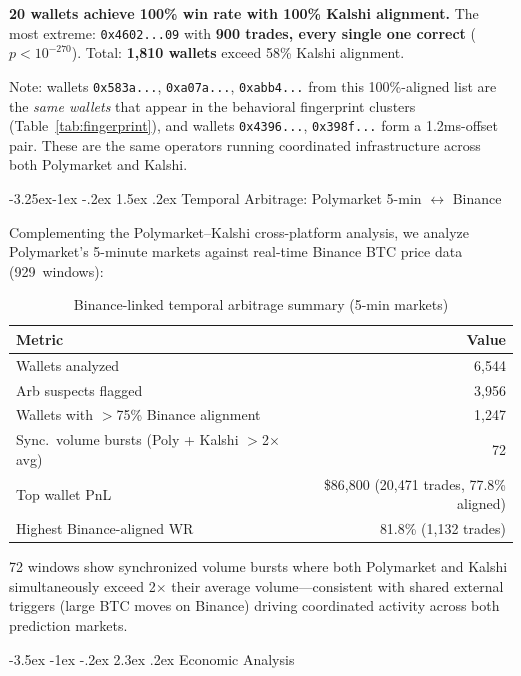 \documentclass[11pt,a4paper]{article}
\makeatletter
\renewcommand\section{\@startsection{section}{1}{\z@}%
  {-3.5ex \@plus -1ex \@minus -.2ex}%
  {2.3ex \@plus .2ex}%
  {\normalfont\Large\bfseries}}
\renewcommand\subsection{\@startsection{subsection}{2}{\z@}%
  {-3.25ex\@plus -1ex \@minus -.2ex}%
  {1.5ex \@plus .2ex}%
  {\normalfont\large\bfseries}}
\makeatother
\begin{document}
\textbf{20 wallets achieve 100\% win rate with 100\% Kalshi alignment.} The most extreme: \texttt{0x4602...09} with \textbf{900 trades, every single one correct} ($p < 10^{-270}$). Total: \textbf{1,810 wallets} exceed 58\% Kalshi alignment.

Note: wallets \texttt{0x583a...}, \texttt{0xa07a...}, \texttt{0xabb4...} from this 100\%-aligned list are the \emph{same wallets} that appear in the behavioral fingerprint clusters (Table~\ref{tab:fingerprint}), and wallets \texttt{0x4396...}, \texttt{0x398f...} form a 1.2ms-offset pair. These are the same operators running coordinated infrastructure across both Polymarket and Kalshi.

\subsection{Temporal Arbitrage: Polymarket 5-min $\leftrightarrow$ Binance}

Complementing the Polymarket--Kalshi cross-platform analysis, we analyze Polymarket's 5-minute markets against real-time Binance BTC price data (929~windows):

\begin{table}[H]
\centering
\caption{Binance-linked temporal arbitrage summary (5-min markets)}
\label{tab:binance_temporal}
\small
\begin{tabular}{@{}lr@{}}
\toprule
\textbf{Metric} & \textbf{Value} \\
\midrule
Wallets analyzed & 6,544 \\
Arb suspects flagged & 3,956 \\
Wallets with $>$75\% Binance alignment & 1,247 \\
Sync.\ volume bursts (Poly + Kalshi $>$2$\times$ avg) & 72 \\
\midrule
Top wallet PnL & \$86,800 (20,471 trades, 77.8\% aligned) \\
Highest Binance-aligned WR & 81.8\% (1,132 trades) \\
\bottomrule
\end{tabular}
\end{table}

72 windows show synchronized volume bursts where both Polymarket and Kalshi simultaneously exceed 2$\times$ their average volume---consistent with shared external triggers (large BTC moves on Binance) driving coordinated activity across both prediction markets.

\newpage
\section{Economic Analysis}
\end{document}
